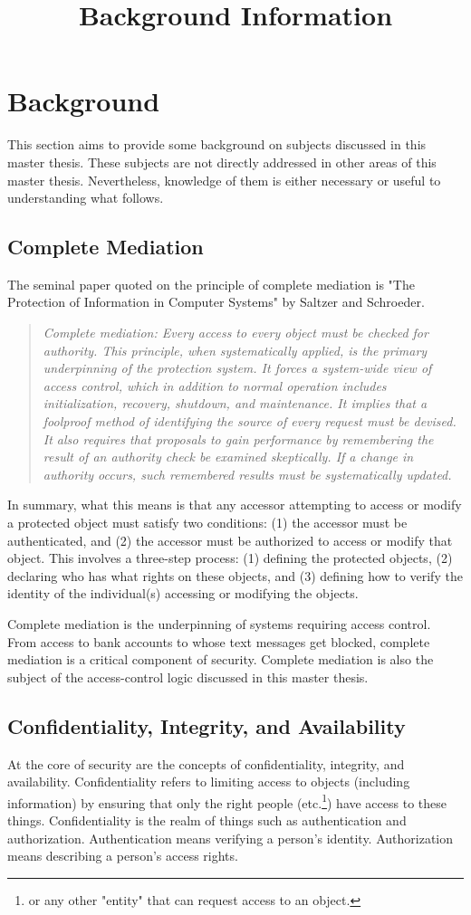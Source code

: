 \documentclass[../../main/main.tex]{subfiles}
\begin{document}
\title{Background Information}

\chapter{Background}\label{chp:background}
This section aims to provide some background on subjects discussed in this master thesis.  These subjects are not directly addressed in other areas of this master thesis.  Nevertheless, knowledge of them is either necessary or useful to understanding what follows.  

\section{Complete Mediation}
The seminal paper quoted on the principle of complete mediation is "The Protection of Information in Computer Systems" by Saltzer and Schroeder.  
\begin{quote}
\textit{
Complete mediation: Every access to every object must be checked for authority. This principle, when systematically applied, is the primary underpinning of the protection system. It forces a system-wide view of access control, which in addition to normal operation includes initialization, recovery, shutdown, and maintenance. It implies that a foolproof method of identifying the source of every request must be devised. It also requires that proposals to gain performance by remembering the result of an authority check be examined skeptically. If a change in authority occurs, such remembered results must be systematically updated.} \cite{saltzer}
\end{quote}

In summary, what this means is that any accessor attempting to access or modify a protected object must satisfy two conditions: (1) the accessor must be authenticated, and (2) the accessor must be authorized to access or modify that object.  This involves a three-step process: (1) defining the protected objects, (2) declaring who has what rights on these objects, and (3) defining how to verify the identity of the individual(s) accessing or modifying the objects.  


Complete mediation is the underpinning of systems requiring access control.  From access to bank accounts to whose text messages get blocked, complete mediation is a critical component of security.  Complete mediation is also the subject of the access-control logic discussed in this master thesis. 

\section{Confidentiality, Integrity, and Availability}
At the core of security are the concepts of confidentiality, integrity, and availability.  Confidentiality refers to limiting access to objects (including information) by ensuring that only the right people (etc.\footnote{or any other "entity" that can request access to an object.}) have access to these things.  Confidentiality is the realm of things such as authentication and authorization.  Authentication means verifying a person's identity.  Authorization means describing a person's access rights. 
\end{document}
